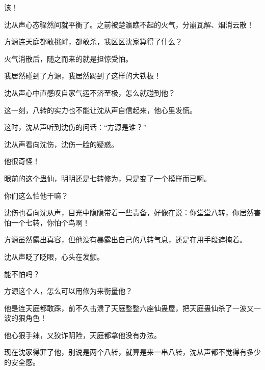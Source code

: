 \begin{this_body}
该！

沈从声心态骤然间就平衡了。之前被楚瀛瞧不起的火气，分崩瓦解、烟消云散！

方源连天庭都敢挑衅，都敢杀，我区区沈家算得了什么？

火气消散后，随之而来的就是担惊受怕。

我居然碰到了方源，我居然踢到了这样的大铁板！

沈从声心中直感叹自家气运不济至极，怎么就碰到他？

这一刻，八转的实力也不能让沈从声自信起来，他心里发慌。

这时，沈从声听到沈伤的问话：“方源是谁？”

沈从声看向沈伤，沈伤一脸的疑惑。

他很奇怪！

眼前的这个蛊仙，明明还是七转修为，只是变了一个模样而已啊。

你们这么怕他干嘛？

沈伤也看向沈从声，目光中隐隐带着一些责备，好像在说：你堂堂八转，你居然害怕一个七转，你怕个鸟啊！

方源虽然露出真容，但他没有暴露出自己的八转气息，还是在用手段遮掩着。

沈从声眨了眨眼，心头在发颤。

能不怕吗？

方源这个人，怎么可以用修为来衡量他？

他是连天庭都敢踩，前不久击溃了天庭整整六座仙蛊屋，把天庭蛊仙杀了一波又一波的狠角色！

他心狠手辣，又狡诈阴险，天庭都拿他没有办法。

现在沈家得罪了他，别说是两个八转，就算是来一串八转，沈从声都不觉得有多少的安全感。

\end{this_body}

